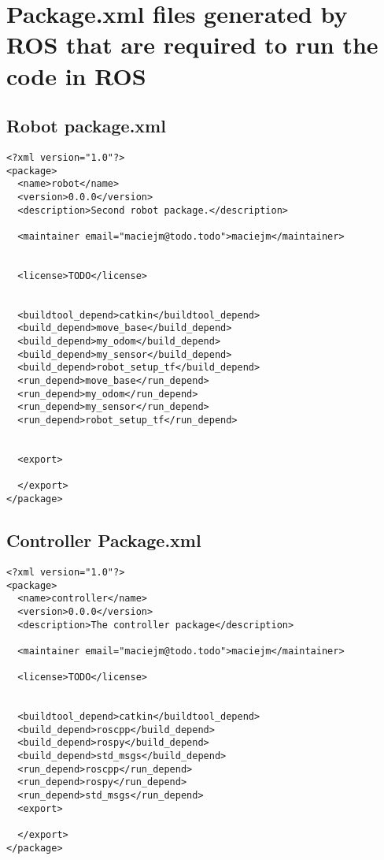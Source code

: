 \section{Package.xml files generated by ROS that are required to run the code in ROS}

\subsection{Robot package.xml}
\begin{lstlisting}
<?xml version="1.0"?>
<package>
  <name>robot</name>
  <version>0.0.0</version>
  <description>Second robot package.</description>

  <maintainer email="maciejm@todo.todo">maciejm</maintainer>


  <license>TODO</license>


  <buildtool_depend>catkin</buildtool_depend>
  <build_depend>move_base</build_depend>
  <build_depend>my_odom</build_depend>
  <build_depend>my_sensor</build_depend>
  <build_depend>robot_setup_tf</build_depend>
  <run_depend>move_base</run_depend>
  <run_depend>my_odom</run_depend>
  <run_depend>my_sensor</run_depend>
  <run_depend>robot_setup_tf</run_depend>


  <export>

  </export>
</package>
\end{lstlisting}
\subsection{Controller Package.xml}
\begin{lstlisting}
<?xml version="1.0"?>
<package>
  <name>controller</name>
  <version>0.0.0</version>
  <description>The controller package</description>

  <maintainer email="maciejm@todo.todo">maciejm</maintainer>

  <license>TODO</license>


  <buildtool_depend>catkin</buildtool_depend>
  <build_depend>roscpp</build_depend>
  <build_depend>rospy</build_depend>
  <build_depend>std_msgs</build_depend>
  <run_depend>roscpp</run_depend>
  <run_depend>rospy</run_depend>
  <run_depend>std_msgs</run_depend>
  <export>

  </export>
</package>
\end{lstlisting}
